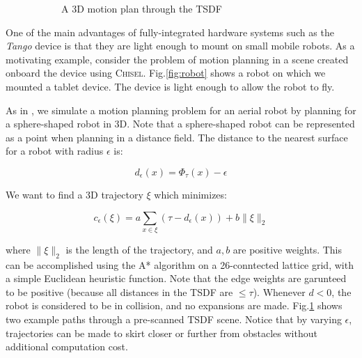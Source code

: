 \documentclass[conference]{IEEEtran}
\newcommand{\figref}[1]{Fig.\ref{#1}}
\newcommand{\Tango}{\textit{Tango}\xspace}
\newcommand{\TSDF}{TSDF\xspace}
\newcommand{\chisel}{\textsc{Chisel}\xspace}
\begin{document}
\begin{figure}
\begin{subfigure}{1.0\columnwidth}
	 \caption{A 3D motion plan through the \TSDF}
	 \label{fig:path_plan}
	 \end{subfigure}
      \caption{}
  \label{fig:robot_figure}
\end{figure} 
 One of the main advantages of fully-integrated hardware systems such as the
\Tango device is that they are light enough to mount on small mobile
 robots. As a motivating example, consider the problem of motion planning in
 a scene created onboard the device using \chisel. \figref{fig:robot} shows a
 robot on which we mounted a tablet device. The device is light enough to allow
 the robot to fly.
 
 As in \cite{FlyingNavigation}, we simulate a motion planning problem for an
 aerial robot by planning for a sphere-shaped robot in 3D. Note that a sphere-shaped robot can be
 represented as a point when planning in a distance field. The distance to the
 nearest surface for a robot with radius $\epsilon$ is:
 
 \begin{equation}
   d_{\epsilon}(x) = \Phi_\tau(x) - \epsilon
 \end{equation}
 
 \noindent We want to find a 3D trajectory $\xi$ which minimizes:
 
 \begin{equation}
      c_{\epsilon}(\xi) = a \sum_{x \in \xi} \left(\tau -
      d_{\epsilon}(x)\right) + b\|\xi\|_2
 \end{equation} 
 
\noindent where $\|\xi\|_2$ is the length of the trajectory, and $a, b$ are
positive weights. This can be accomplished using the A* algorithm on a
26-conntected lattice grid, with a simple Euclidean heuristic function. Note
that the edge weights are garunteed to be positive (because all distances in the
\TSDF are $\leq\tau$). Whenever $d < 0$, the robot is considered to be in
collision, and no expansions are made.
\figref{fig:path_plan} shows two example paths through a pre-scanned \TSDF scene.
Notice that by varying $\epsilon$, trajectories can be made to skirt closer or further from obstacles without
additional computation cost.
 
\end{document}
